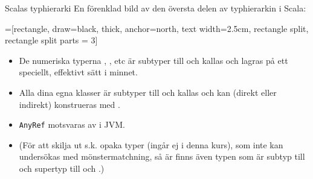 \begin{Slide}{Scalas typhierarki}\SlideFontSmall
En förenklad bild av den översta delen av typhierarkin i Scala:
\vspace{0.5em}
\begin{center}
\newcommand{\TextBox}[1]{\raisebox{0pt}[1em][0.5em]{#1}}
=[rectangle, draw=black,  thick, anchor=north, text width=2.5cm, rectangle split, rectangle split parts = 3]
\end{center}
\begin{itemize}\SlideFontSmall
\item De numeriska typerna , , etc är subtyper till  och kallas  och lagras på ett speciellt, effektivt sätt i minnet.
\item Alla dina egna klasser är subtyper till  och kallas  och kan (direkt eller indirekt) konstrueras med .
\item \texttt{AnyRef} motsvaras av  i JVM.
\item (För att skilja ut s.k. opaka typer (ingår ej i denna kurs), som inte kan undersökas med mönstermatchning, så är finns även typen  som är subtyp till  och supertyp till  och .)
\end{itemize}
\end{Slide}



